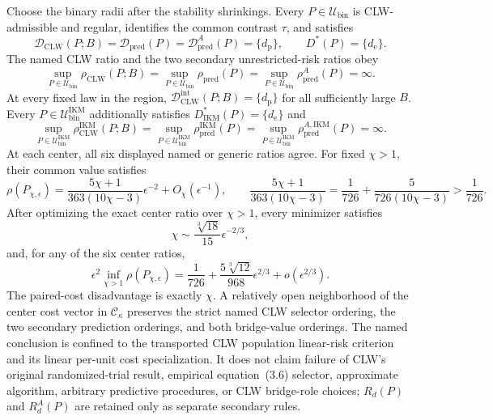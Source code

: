 Choose the binary radii after the stability shrinkings.  Every \(P\in\mathcal U_{\mathrm{bin}}\) is CLW-admissible and regular, identifies the common contrast \(\tau\), and satisfies
\[
 \mathcal D_{\mathrm{CLW}}(P;B)
 =\mathcal D_{\mathrm{pred}}(P)
 =\mathcal D_{\mathrm{pred}}^A(P)=\{d_{\mathrm p}\},
 \qquad D^*(P)=\{d_{\mathrm e}\}.                         \tag{1}
\]
The named CLW ratio and the two secondary unrestricted-risk ratios obey
\[
 \sup_{P\in\mathcal U_{\mathrm{bin}}}\rho_{\mathrm{CLW}}(P;B)
 =\sup_{P\in\mathcal U_{\mathrm{bin}}}\rho_{\mathrm{pred}}(P)
 =\sup_{P\in\mathcal U_{\mathrm{bin}}}\rho_{\mathrm{pred}}^A(P)=\infty. \tag{2}
\]
At every fixed law in the region, \(\mathcal D_{\mathrm{CLW}}^{\mathrm{int}}(P;B)=\{d_{\mathrm p}\}\) for all sufficiently large \(B\).  Every \(P\in\mathcal U_{\mathrm{bin}}^{\mathrm{IKM}}\) additionally satisfies \(D_{\mathrm{IKM}}^*(P)=\{d_{\mathrm e}\}\) and
\[
 \sup_{P\in\mathcal U_{\mathrm{bin}}^{\mathrm{IKM}}}
 \rho_{\mathrm{CLW}}^{\mathrm{IKM}}(P;B)
 =\sup_{P\in\mathcal U_{\mathrm{bin}}^{\mathrm{IKM}}}
 \rho_{\mathrm{pred}}^{\mathrm{IKM}}(P)
 =\sup_{P\in\mathcal U_{\mathrm{bin}}^{\mathrm{IKM}}}
 \rho_{\mathrm{pred}}^{A,\mathrm{IKM}}(P)=\infty.         \tag{3}
\]
At each center, all six displayed named or generic ratios agree.  For fixed \(\chi>1\), their common value satisfies
\[
 \rho(P_{\chi,\epsilon})
 =\frac{5\chi+1}{363(10\chi-3)}\epsilon^{-2}
 +O_\chi(\epsilon^{-1}),
 \qquad
 \frac{5\chi+1}{363(10\chi-3)}
 =\frac1{726}+\frac5{726(10\chi-3)}>\frac1{726}.          \tag{4}
\]
After optimizing the exact center ratio over \(\chi>1\), every minimizer satisfies
\[
 \chi\sim\frac{\sqrt[3]{18}}{15}\epsilon^{-2/3},          \tag{5}
\]
and, for any of the six center ratios,
\[
 \epsilon^2\inf_{\chi>1}\rho(P_{\chi,\epsilon})
 =\frac1{726}+\frac{5\sqrt[3]{12}}{968}\epsilon^{2/3}
 +o(\epsilon^{2/3}).                                      \tag{6}
\]
The paired-cost disadvantage is exactly \(\chi\).  A relatively open neighborhood of the center cost vector in \(\mathcal C_\kappa\) preserves the strict named CLW selector ordering, the two secondary prediction orderings, and both bridge-value orderings.  The named conclusion is confined to the transported CLW population linear-risk criterion and its linear per-unit cost specialization.  It does not claim failure of CLW's original randomized-trial result, empirical equation~(3.6) selector, approximate algorithm, arbitrary predictive procedures, or CLW bridge-role choices; \(R_d(P)\) and \(R_d^A(P)\) are retained only as separate secondary rules.